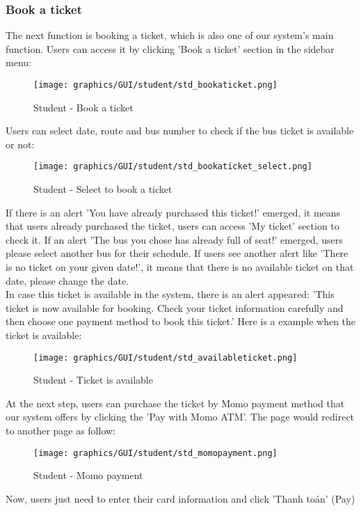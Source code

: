           \subsubsection{Book a ticket}      
            \noindent The next function is booking a ticket, which is also one of our system's main function. Users can access it by clicking 'Book a ticket' section in the sidebar menu:
                \begin{figure}[H]
                    \centering
                    \texttt{[image: graphics/GUI/student/std\_bookaticket.png]}
                    \caption{Student - Book a ticket}
                \label{fig:std_bookaticket}
                \end{figure}
            \noindent Users can select date, route and bus number to check if the bus ticket is available or not:
                \begin{figure}[H]
                    \centering
                    \texttt{[image: graphics/GUI/student/std\_bookaticket\_select.png]}
                    \caption{Student - Select to book a ticket}
                \label{fig:std_select_bookaticket}
                \end{figure}
                \noindent If there is an alert 'You have already purchased this ticket!' emerged, it means that users already purchased the ticket, users can access 'My ticket' section to check it. If an alert 'The bus you chose has already full of seat!' emerged, users please select another bus for their schedule. If users see another alert like 'There is no ticket on your given date!', it means that there is no available ticket on that date, please change the date.\\
                \noindent In case this ticket is available in the system, there is an alert appeared: 'This ticket is now available for booking. Check your ticket information carefully and then choose one payment method to book this ticket.' Here is a example when the ticket is available:
                    \begin{figure}[H]
                        \centering
                        \texttt{[image: graphics/GUI/student/std\_availableticket.png]}
                        \caption{Student - Ticket is available}
                    \label{fig:std_ticketavailable}
                    \end{figure}
                \noindent At the next step, users can purchase the ticket by Momo payment method that our system offers by clicking the 'Pay with Momo ATM'. The page would redirect to another page as follow:
                    \begin{figure}[H]
                        \centering
                        \texttt{[image: graphics/GUI/student/std\_momopayment.png]}
                        \caption{Student - Momo payment}
                    \label{fig:std_momopayment}
                    \end{figure}
                \noindent Now, users just need to enter their card information and click 'Thanh toán' (Pay)
                

